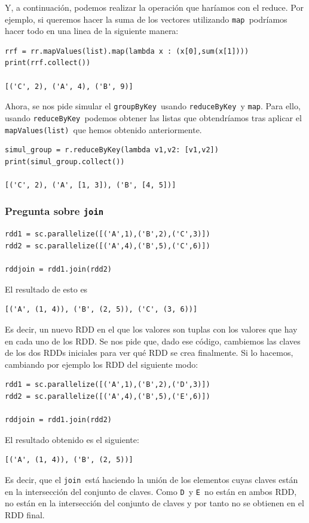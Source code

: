\documentclass[11pt]{article}
\def\inline{\lstinline[basicstyle=\ttfamily,keywordstyle={}]}
\begin{document}
{{Y, a continuación, podemos realizar la operación que haríamos con el reduce. Por ejemplo, si queremos hacer la suma de los vectores utilizando \inline{map }podríamos hacer todo en una linea de la siguiente manera:
\begin{verbatim}
rrf = rr.mapValues(list).map(lambda x : (x[0],sum(x[1])))
print(rrf.collect())

[('C', 2), ('A', 4), ('B', 9)]
\end{verbatim}

Ahora, se nos pide simular el \inline{groupByKey }usando \inline{reduceByKey }y  \inline{map}. Para ello, usando \inline{reduceByKey }podemos obtener las listas que obtendríamos tras aplicar el \inline{mapValues(list) }que hemos obtenido anteriormente.
\begin{verbatim}
simul_group = r.reduceByKey(lambda v1,v2: [v1,v2])
print(simul_group.collect())

[('C', 2), ('A', [1, 3]), ('B', [4, 5])]
\end{verbatim}

\subsubsection*{ Pregunta sobre  \inline{join}}

\begin{verbatim}
rdd1 = sc.parallelize([('A',1),('B',2),('C',3)])
rdd2 = sc.parallelize([('A',4),('B',5),('C',6)])

rddjoin = rdd1.join(rdd2)
\end{verbatim}

El resultado de esto es 
\begin{verbatim}
[('A', (1, 4)), ('B', (2, 5)), ('C', (3, 6))]
\end{verbatim}

Es decir, un nuevo RDD en el que los valores son tuplas con los valores que hay en cada uno de los RDD. Se nos pide que, dado ese código, cambiemos las claves de los dos RDDs iniciales para ver qué RDD se crea finalmente. Si lo hacemos, cambiando por ejemplo los RDD del siguiente modo:
\begin{verbatim}
rdd1 = sc.parallelize([('A',1),('B',2),('D',3)])
rdd2 = sc.parallelize([('A',4),('B',5),('E',6)])

rddjoin = rdd1.join(rdd2)
\end{verbatim}
El resultado obtenido es el siguiente:
\begin{verbatim}
[('A', (1, 4)), ('B', (2, 5))]
\end{verbatim}
Es decir, que el \inline{join }está haciendo la unión de los elementos cuyas claves están en la intersección del conjunto de claves. Como \inline{D }y \inline{E }no están en ambos RDD, no están en la intersección del conjunto de claves y por tanto no se obtienen en el RDD final.

}}
\end{document}
